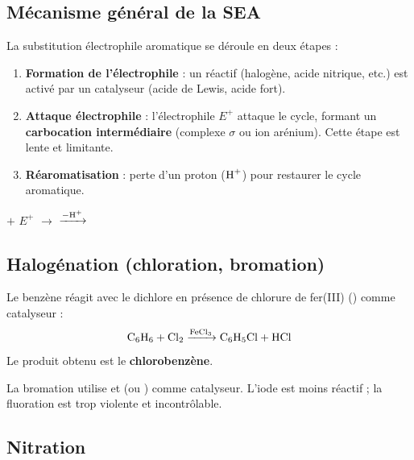 \subsection{Mécanisme général de la SEA}

\begin{experience}
La substitution électrophile aromatique se déroule en deux étapes :
\begin{enumerate}
    \item \textbf{Formation de l'électrophile} : un réactif (halogène, acide nitrique, etc.) est activé par un catalyseur (acide de Lewis, acide fort).
    \item \textbf{Attaque électrophile} : l'électrophile $E^+$ attaque le cycle, formant un \textbf{carbocation intermédiaire} (complexe $\sigma$ ou ion arénium). Cette étape est lente et limitante.
    \item \textbf{Réaromatisation} : perte d'un proton ($\ce{H+}$) pour restaurer le cycle aromatique.
\end{enumerate}
\end{experience}

\begin{illus}
\quad $+$ \quad $E^+$ \quad $\longrightarrow$ \quad
{}
\quad $\xrightarrow{-\ce{H+}}$ \quad
{}
\end{illus}

\subsection{Halogénation (chloration, bromation)}

\begin{experience}
Le benzène réagit avec le dichlore en présence de chlorure de fer(III) () comme catalyseur :
\[\ce{C6H6 + Cl2 ->[FeCl3] C6H5Cl + HCl}\]
Le produit obtenu est le \textbf{chlorobenzène}.
\end{experience}

\begin{remarque}
La bromation utilise  et  (ou ) comme catalyseur. L'iode est moins réactif ; la fluoration est trop violente et incontrôlable.
\end{remarque}

\subsection{Nitration}

